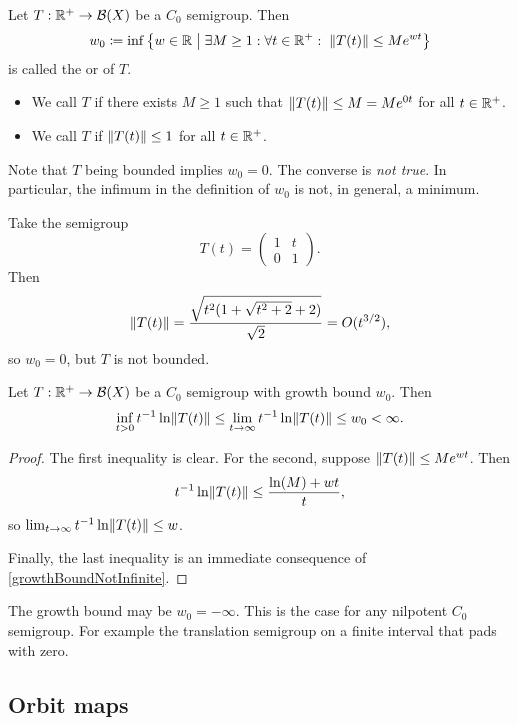 \begin{definition}
Let $T: \mathbb{R}^+ \to \operatorname{\mathcal{B}}(X)$ be a $C_0$ semigroup. Then
\[ w_0 \defeq \inf\setbuilder{w\in \R}{\exists M \geq 1: \forall t\in \R^+: \; \norm{T(t)} \leq Me^{wt}} \]
is called the  or  of $T$.
\begin{itemize}
\item We call $T$  if there exists $M\geq 1$ such that $\lVert T(t)\rVert\leq M = Me^{0t}$ for all $t\in \mathbb{R}^+$.
\item We call $T$  if $\lVert T(t)\rVert \leq 1$ for all $t\in \mathbb{R}^+$.
\end{itemize}
\end{definition}
Note that $T$ being bounded implies $w_0 = 0$. The converse is \emph{not true}. In particular, the infimum in the definition of $w_0$ is not, in general, a minimum.

\begin{example}
Take the semigroup
\[ T(t) = \begin{pmatrix}
1 & t \\ 0 & 1
\end{pmatrix}. \]
Then
\[ \lVert T(t)\rVert = \frac{\sqrt{t^2(1+\sqrt{t^2+2}+ 2)}}{\sqrt{2}} = O(t^{3/2}), \]
so $w_0 = 0$, but $T$ is not bounded.
\end{example}

\begin{lemma}
Let $T: \mathbb{R}^+ \to \operatorname{\mathcal{B}}(X)$ be a $C_0$ semigroup with growth bound $w_0$. Then
\[ \inf_{t>0}t^{-1}\ln\lVert T(t)\rVert \leq \lim_{t\to \infty}t^{-1}\ln\lVert T(t)\rVert \leq w_0 < \infty. \]
\end{lemma}
\begin{proof}
The first inequality is clear. For the second, suppose $\lVert T(t)\rVert \leq Me^{wt}$. Then
\[ t^{-1}\ln\lVert T(t)\rVert \leq \frac{\ln(M) + wt}{t}, \]
so $\lim_{t\to \infty}t^{-1}\ln\lVert T(t)\rVert \leq w$.

Finally, the last inequality is an immediate consequence of \ref{growthBoundNotInfinite}.
\end{proof}

\begin{example}
The growth bound may be $w_0 = -\infty$. This is the case for any nilpotent $C_0$ semigroup. For example the translation semigroup on a finite interval that pads with zero.
\end{example}


\subsection{Orbit maps}

